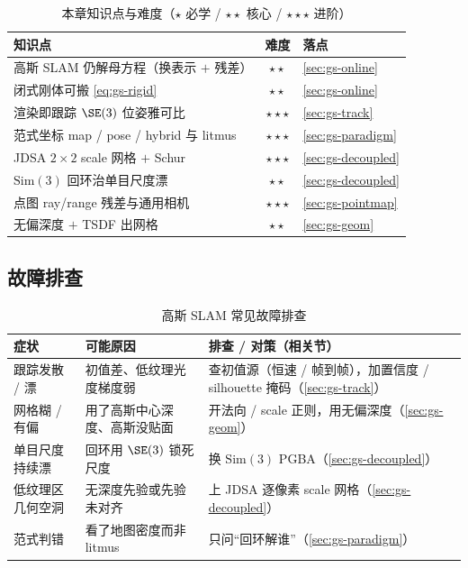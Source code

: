 \begin{table}[H]\centering
\caption{本章知识点与难度（$\star$ 必学 / $\star\star$ 核心 / $\star\star\star$ 进阶）}
\label{tab:gs-points}
\small
\begin{tabular}{@{}lcl@{}}
\toprule
知识点 & 难度 & 落点 \\
\midrule
高斯 SLAM 仍解母方程（换表示 $+$ 残差）& $\star\star$ & \cref{sec:gs-online} \\
闭式刚体可搬 \cref{eq:gs-rigid} & $\star\star$ & \cref{sec:gs-online} \\
渲染即跟踪 $\SE(3)$ 位姿雅可比 & $\star\star\star$ & \cref{sec:gs-track} \\
范式坐标 map / pose / hybrid 与 litmus & $\star\star\star$ & \cref{sec:gs-paradigm} \\
JDSA $2\times2$ scale 网格 $+$ Schur & $\star\star\star$ & \cref{sec:gs-decoupled} \\
$\mathrm{Sim}(3)$ 回环治单目尺度漂 & $\star\star$ & \cref{sec:gs-decoupled} \\
点图 ray/range 残差与通用相机 & $\star\star\star$ & \cref{sec:gs-pointmap} \\
无偏深度 $+$ TSDF 出网格 & $\star\star$ & \cref{sec:gs-geom} \\
\bottomrule
\end{tabular}
\end{table}

\subsection{故障排查}

\begin{table}[H]\centering
\caption{高斯 SLAM 常见故障排查}
\label{tab:gs-trouble}
\small
\begin{tabular}{@{}p{3.2cm}p{4.2cm}p{4.6cm}@{}}
\toprule
症状 & 可能原因 & 排查 / 对策（相关节）\\
\midrule
跟踪发散 / 漂 & 初值差、低纹理光度梯度弱 & 查初值源（恒速 / 帧到帧），加置信度 / silhouette 掩码（\cref{sec:gs-track}）\\
网格糊 / 有偏 & 用了高斯中心深度、高斯没贴面 & 开法向 / scale 正则，用无偏深度（\cref{sec:gs-geom}）\\
单目尺度持续漂 & 回环用 $\SE(3)$ 锁死尺度 & 换 $\mathrm{Sim}(3)$ PGBA（\cref{sec:gs-decoupled}）\\
低纹理区几何空洞 & 无深度先验或先验未对齐 & 上 JDSA 逐像素 scale 网格（\cref{sec:gs-decoupled}）\\
范式判错 & 看了地图密度而非 litmus & 只问“回环解谁”（\cref{sec:gs-paradigm}）\\
\bottomrule
\end{tabular}
\end{table}

